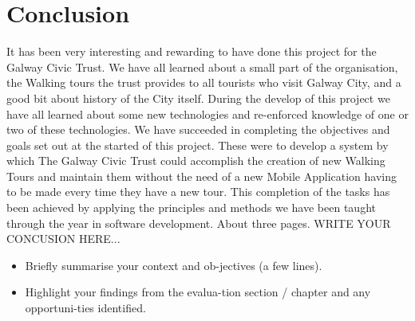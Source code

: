 \chapter{Conclusion}
It has been very interesting and rewarding to have done this project for the Galway Civic Trust. We have all learned about a small part of the organisation, the Walking tours the trust provides to all tourists who visit Galway City, and a good bit about history of the City itself.   
During the develop of this project we have all learned about some new technologies and re-enforced knowledge of one or two of these technologies. We have succeeded in completing the objectives and goals set out at the started of this project. These were to develop a system by which The Galway Civic Trust could accomplish the creation of new Walking Tours and maintain them without the need of a new Mobile Application having to be made every time they have a new tour. This completion of the tasks has been achieved by applying the principles and methods we have been taught through the year in software development. 
About three pages. WRITE YOUR CONCUSION HERE...

\begin{itemize}
	\item Briefly summarise your context and ob-jectives (a few lines).
	\item Highlight your findings from the evalua-tion section / chapter and any opportuni-ties identified.
\end{itemize}
